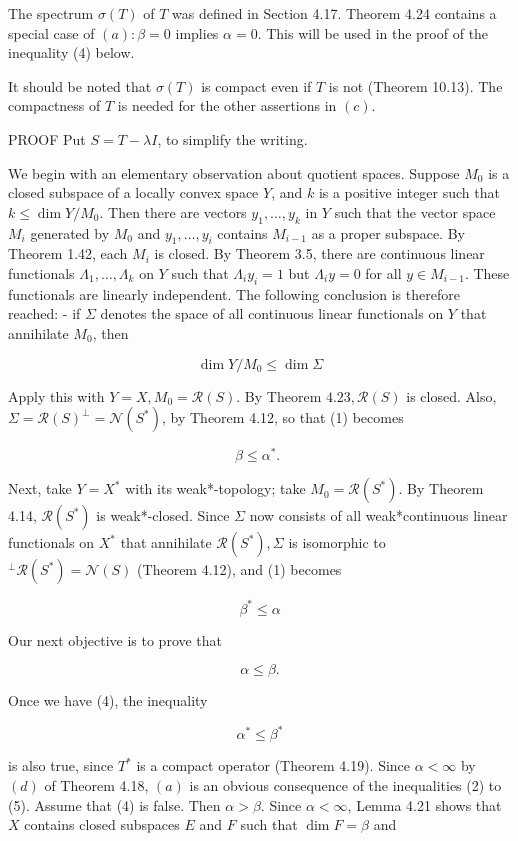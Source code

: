 \documentclass[10pt]{article}
\begin{document}
The spectrum $\sigma(T)$ of $T$ was defined in Section 4.17. Theorem 4.24 contains a special case of $(a): \beta=0$ implies $\alpha=0$. This will be used in the proof of the inequality (4) below.

It should be noted that $\sigma(T)$ is compact even if $T$ is not (Theorem 10.13). The compactness of $T$ is needed for the other assertions in $(c)$.

PROOF Put $S=T-\lambda I$, to simplify the writing.

We begin with an elementary observation about quotient spaces. Suppose $M_{0}$ is a closed subspace of a locally convex space $Y$, and $k$ is a positive integer such that $k \leq \operatorname{dim} Y / M_{0}$. Then there are vectors $y_{1}, \ldots, y_{k}$ in $Y$ such that the vector space $M_{i}$ generated by $M_{0}$ and $y_{1}, \ldots, y_{i}$ contains $M_{i-1}$ as a proper subspace. By Theorem 1.42, each $M_{i}$ is closed. By Theorem 3.5, there are continuous linear functionals $\Lambda_{1}, \ldots, \Lambda_{k}$ on $Y$ such that $\Lambda_{i} y_{i}=1$ but $\Lambda_{i} y=0$ for all $y \in M_{i-1}$. These functionals are linearly independent. The following conclusion is therefore reached: - if $\Sigma$ denotes the space of all continuous linear functionals on $Y$ that annihilate $M_{0}$, then

$$
\operatorname{dim} Y / M_{0} \leq \operatorname{dim} \Sigma
$$

Apply this with $Y=X, M_{0}=\mathscr{R}(S)$. By Theorem $4.23, \mathscr{R}(S)$ is closed. Also, $\Sigma=\mathscr{R}(S)^{\perp}=\mathscr{N}\left(S^{*}\right)$, by Theorem 4.12, so that (1) becomes

$$
\beta \leq \alpha^{*} \text {. }
$$

Next, take $Y=X^{*}$ with its weak*-topology; take $M_{0}=\mathscr{R}\left(S^{*}\right)$. By Theorem 4.14, $\mathscr{R}\left(S^{*}\right)$ is weak*-closed. Since $\Sigma$ now consists of all weak*continuous linear functionals on $X^{*}$ that annihilate $\mathscr{R}\left(S^{*}\right), \Sigma$ is isomorphic to ${ }^{\perp} \mathscr{R}\left(S^{*}\right)=\mathscr{N}(S)$ (Theorem 4.12), and (1) becomes

$$
\beta^{*} \leq \alpha
$$

Our next objective is to prove that

$$
\alpha \leq \beta .
$$

Once we have (4), the inequality

$$
\alpha^{*} \leq \beta^{*}
$$

is also true, since $T^{*}$ is a compact operator (Theorem 4.19). Since $\alpha<\infty$ by $(d)$ of Theorem 4.18, $(a)$ is an obvious consequence of the inequalities (2) to (5). Assume that (4) is false. Then $\alpha>\beta$. Since $\alpha<\infty$, Lemma 4.21 shows that $X$ contains closed subspaces $E$ and $F$ such that $\operatorname{dim} F=\beta$ and
\end{document}
